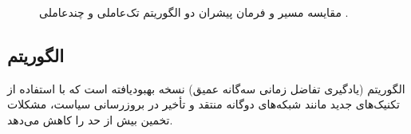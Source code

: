 \begin{figure}[H]
	\centering
	
	
	\caption{
		مقایسه مسیر و فرمان پیشران دو الگوریتم تک‌عاملی و چندعاملی .
	}
\end{figure}


\subsection{الگوریتم }

الگوریتم  (یادگیری تفاضل زمانی سه‌گانه عمیق) نسخه بهبودیافته  است که با استفاده از تکنیک‌های جدید مانند شبکه‌های دوگانه منتقد و تأخیر در بروزرسانی سیاست، مشکلات تخمین بیش از حد را کاهش می‌دهد.

